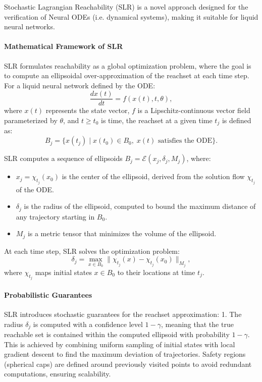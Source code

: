 Stochastic Lagrangian Reachability (SLR) is a novel approach designed for the verification of Neural ODEs (i.e. dynamical systems), making it suitable for liquid neural networks.

\paragraph{Mathematical Framework of SLR}
SLR formulates reachability as a global optimization problem, where the goal is to compute an ellipsoidal over-approximation of the reachset at each time step. For a liquid neural network defined by the ODE:
\[
\frac{dx(t)}{dt} = f(x(t), t, \theta),
\]
where \(x(t)\) represents the state vector, \(f\) is a Lipschitz-continuous vector field parameterized by \(\theta\), and \(t \geq t_0\) is time, the reachset at a given time \(t_j\) is defined as:
\[
B_j = \{ x(t_j) \mid x(t_0) \in B_0, \; x(t) \text{ satisfies the ODE} \}.
\]

SLR computes a sequence of ellipsoids \(B_j = \mathcal{E}(x_j, \delta_j, M_j)\), where:
\begin{itemize}
    \item \(x_j = \chi_{t_j}(x_0)\) is the center of the ellipsoid, derived from the solution flow \(\chi_{t_j}\) of the ODE.
    \item \(\delta_j\) is the radius of the ellipsoid, computed to bound the maximum distance of any trajectory starting in \(B_0\).
    \item \(M_j\) is a metric tensor that minimizes the volume of the ellipsoid.
\end{itemize}

At each time step, SLR solves the optimization problem:
\[
\delta_j = \max_{x \in B_0} \| \chi_{t_j}(x) - \chi_{t_j}(x_0) \|_{M_j},
\]
where \(\chi_{t_j}\) maps initial states \(x \in B_0\) to their locations at time \(t_j\).

\paragraph{Probabilistic Guarantees}
SLR introduces stochastic guarantees for the reachset approximation: 1. The radius \(\delta_j\) is computed with a confidence level \(1 - \gamma\), meaning that the true reachable set is contained within the computed ellipsoid with probability \(1 - \gamma\). This is achieved by combining uniform sampling of initial states with local gradient descent to find the maximum deviation of trajectories. Safety regions (spherical caps) are defined around previously visited points to avoid redundant computations, ensuring scalability.

